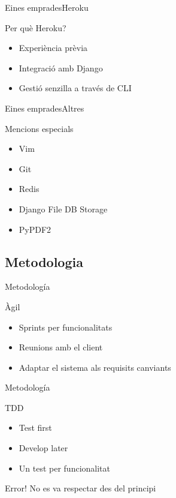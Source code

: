 \documentclass{beamer}
\begin{document}
\begin{frame}{Eines emprades}{Heroku}
    \begin{block}{Per què Heroku?}
        \begin{itemize}
            \item Experiència prèvia
            \pause{}
            \item Integració amb Django
            \pause{}
            \item Gestió senzilla a través de CLI
        \end{itemize}
    \end{block}
\end{frame}

\begin{frame}{Eines emprades}{Altres}
    \begin{block}{Mencions especials}
        \begin{itemize}
            \item Vim
            \pause{}
            \item Git
            \pause{}
            \item Redis
            \pause{}
            \item Django File DB Storage
            \pause{}
            \item PyPDF2
        \end{itemize}
    \end{block}
\end{frame}

\subsection{Metodologia}

\begin{frame}{Metodología}
    \begin{block}{Àgil}
        \begin{itemize}
            \item Sprints per funcionalitats
            \item Reunions amb el client
            \item Adaptar el sistema als requisits canviants
        \end{itemize}
    \end{block}
\end{frame}

\begin{frame}{Metodología}
    \begin{block}{TDD}
        \begin{itemize}
            \item Test first
            \item Develop later
            \item Un test per funcionalitat
        \end{itemize}
    \end{block}
    \pause{}
    \begin{alertblock}{Error!}
        No es va respectar des del principi
    \end{alertblock}
\end{frame}
\end{document}
